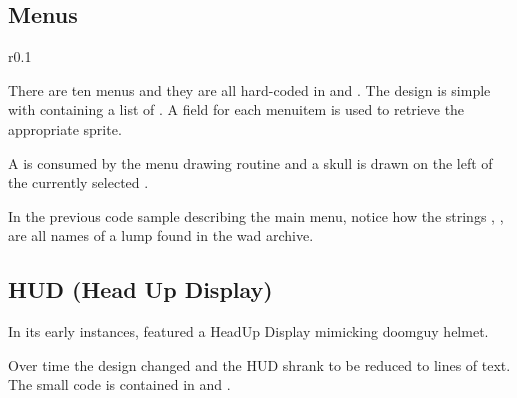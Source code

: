 \subsection{Menus}

\begin{wrapfigure}[5]{r}{0.1\textwidth}
\centering
{}
\end{wrapfigure}
There are ten menus and they are all hard-coded in  and . The design is simple with  containing a list of . A  field for each menuitem is used to retrieve the appropriate sprite.\\
\par


\par
A  is consumed by the menu drawing routine and a skull is drawn on the left of the currently selected .\\
\par
\begin{minipage}{0.55\textwidth}
\end{minipage}
\begin{minipage}{0.45\textwidth}
\centering
{}
\end{minipage}
\par
{}
\par
In the previous code sample describing the main menu, notice how the strings , ,  are all names of a lump found in the wad archive.\\
\par








\subsection{HUD (Head Up Display)}
In its early instances, \doom{} featured a HeadUp Display mimicking doomguy helmet.\\
\par
{}
\par
Over time the design changed and the HUD shrank to be reduced to lines of text. The small code is contained in  and .\\
\par
{}\\
\par



